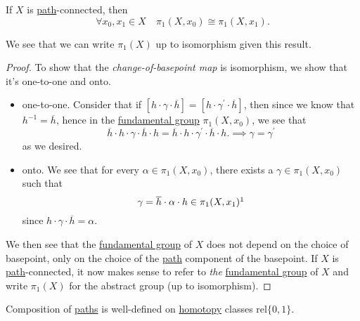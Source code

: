 \begin{theorem}\label{thm:lec8}
	If \(X\) is \hyperref[def:path]{path}-connected, then
	\[
		\forall x_0, x_1\in X\quad \pi_1(X, x_0)\cong \pi _1(X, x_1).
	\]
\end{theorem}
\begin{remark}
	We see that we can write \(\pi _1(X)\) up to isomorphism given this result.
\end{remark}
\begin{proof}
	\par To show that the \emph{change-of-basepoint map} is isomorphism, we show that it's one-to-one and onto.
	\begin{itemize}
		\item one-to-one. Consider that if \([h\cdot \gamma\cdot \overline{h} ] = [h\cdot \gamma ^\prime \cdot \overline{h} ]\), then since we know that \(h^{-1}  = \overline{h} \), hence
		      in the \hyperref[def:fundamental-group]{fundamental group} \(\pi _1(X, x_0)\), we see that
		      \[
			      \overline{h} \cdot h\cdot \gamma\cdot \overline{h} \cdot h = \overline{h} \cdot h\cdot \gamma ^\prime \cdot \overline{h} \cdot h. \implies \gamma = \gamma ^\prime
		      \]
		      as we desired.
		\item onto. We see that for every \(\alpha \in \pi_1(X, x_0)\), there exists a \(\gamma\in \pi_1(X, x_{0})\) such that
		      \[
			      \gamma = \overline{h} \cdot \alpha \cdot h\in \pi _1(X, x_1)\footnotemark
		      \]
		      since \(h\cdot \gamma\cdot \overline{h} =\alpha \).
	\end{itemize}

	\par We then see that the \hyperref[def:fundamental-group]{fundamental group} of \(X\) does not depend on the choice of basepoint, only on the choice of the \hyperref[def:path]{path} component of the basepoint.
	If \(X\) is \hyperref[def:path]{path}-connected, it now makes sense to refer to \emph{the} \hyperref[def:fundamental-group]{fundamental group} of \(X\) and write \(\pi _1(X)\) for the abstract group (up to isomorphism).
\end{proof}

\begin{exercise}
	Composition of \hyperref[def:path]{paths} is well-defined on \hyperref[def:homotopy]{homotopy} classes \hyperref[def:homotopy-relative]{\(\mathrm{rel} \{0, 1\}\)}.
\end{exercise}

